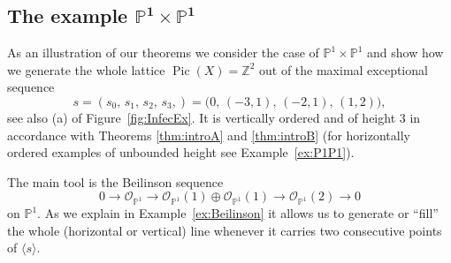 \documentclass[11pt]{article}
\theoremstyle{definition}
\numberwithin{equation}{section}
\newcommand{\PP}{\mathbb P}
\newcommand{\Z}{\mathbb Z}
\newcommand{\CO}{{\mathcal O}}
\newcommand{\Pic}{\operatorname{Pic}}
\newcommand{\cl}{s}
\newcommand{\thLex}{\ref{thm:introA}}
\newcommand{\thHeight}{\ref{thm:introB}}
\begin{document}
\subsection{The example \texorpdfstring{$\mathbf{\PP^1\times\PP^1}$}{P1 x P1}}
\label{subsec:GenDerCat}
As an illustration of our theorems we consider the case of
$\PP^1\times\PP^1$ and show how we generate the 
whole lattice $\Pic(X)=\Z^2$ out of the maximal 
exceptional sequence 
$$
\cl=(\cl_0,\,\cl_1,\,\cl_2,\,\cl_3,)=
\big(0,\,(-3,1),\,(-2,1),\,(1,2)\big),
$$
see also (a) of Figure~\ref{fig:InfecEx}. It 
is vertically ordered and of height $3$ in 
accordance with Theorems {\thLex} and {\thHeight} 
(for horizontally ordered examples of unbounded 
height see Example~\ref{ex:P1P1}).

The main tool is the Beilinson sequence
$$
0\to\CO_{\PP^1}\to\CO_{\PP^1}(1)\oplus\CO_{\PP^1}(1)
\to\CO_{\PP^1}(2)\to0
$$
on $\PP^1$. As we explain in Example~\ref{ex:Beilinson}
it allows us to generate or ``fill'' the whole 
(horizontal or vertical) line whenever it carries two 
consecutive points of $\langle\cl\rangle$.
\end{document}
